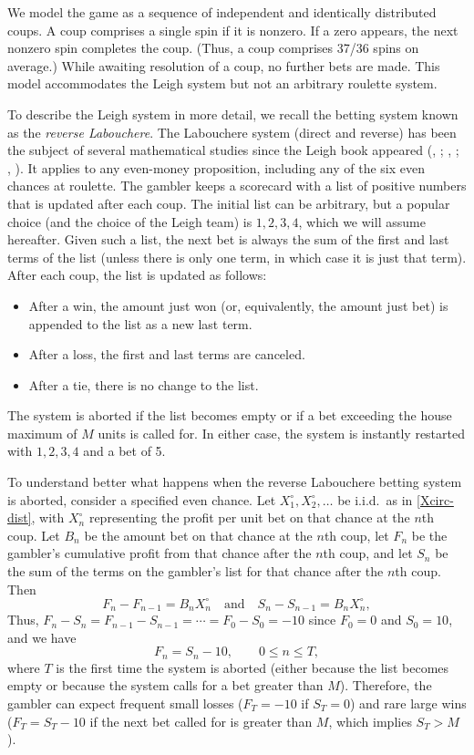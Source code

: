 \documentclass{article}
\theoremstyle{definition}
\theoremstyle{remark}
\begin{document}
We model the game as a sequence of independent and identically distributed coups.  A coup comprises a single spin if it is nonzero.  If a zero appears, the next nonzero spin completes the coup.  (Thus, a coup comprises 37/36 spins on average.)  While awaiting resolution of a coup, no further bets are made.  This model accommodates the Leigh system but not an arbitrary roulette system.  

To describe the Leigh system in more detail, we recall the betting system known as the \textit{reverse Labouchere}.  The Labouchere system (direct and reverse) has been the subject of several mathematical studies since the Leigh book appeared (\citeauthor{D80}, \citeyear{D80}; \citeauthor{E08}, \citeyear{E08}; \citeauthor{HW19}, \citeyear{HW19}).  It applies to any even-money proposition, including any of the six even chances at roulette.  The gambler keeps a scorecard with a list of positive numbers that is updated after each coup.  The initial list can be arbitrary, but a popular choice (and the choice of the Leigh team) is $1,2,3,4$, which we will assume hereafter.  Given such a list, the next bet is always the sum of the first and last terms of the list (unless there is only one term, in which case it is just that term).  After each coup, the list is updated as follows:
\begin{itemize}
\item After a win, the amount just won (or, equivalently, the amount just bet) is appended to the list as a new last term.
\item After a loss, the first and last terms are canceled.
\item After a tie, there is no change to the list.
\end{itemize}
The system is aborted if the list becomes empty or if a bet exceeding the house maximum of $M$ units is called for.  
In either case, the system is instantly restarted with $1,2,3,4$ and a bet of 5.

To understand better what happens when the reverse Labouchere betting system is aborted, consider a specified even chance.  Let $X_1^\circ,X_2^\circ,\ldots$ be i.i.d.\ as in \eqref{Xcirc-dist}, with $X_n^\circ$ representing the profit per unit bet on that chance at the $n$th coup.  Let $B_n$ be the amount bet on that chance at the $n$th coup, let $F_n$ be the gambler's cumulative profit from that chance after the $n$th coup, and let $S_n$ be the sum of the terms on the gambler's list for that chance after the $n$th coup.  Then
\[
F_n-F_{n-1}=B_n X_n^\circ\quad\text{and}\quad S_n-S_{n-1}=B_n X_n^\circ,
\]
Thus, $F_n-S_n=F_{n-1}-S_{n-1}=\cdots=F_0-S_0=-10$ since $F_0=0$ and $S_0=10$, and we have
\begin{equation}\label{cum-profit}
F_n=S_n-10,\qquad 0\le n\le T, 
\end{equation}
where $T$ is the first time the system is aborted (either because the list becomes empty or because the system calls for a bet greater than $M$).  Therefore, the gambler can expect frequent small losses ($F_T=-10$ if $S_T=0$) and rare large wins ($F_T=S_T-10$ if the next bet called for is greater than $M$, which implies $S_T>M$).
\end{document}
